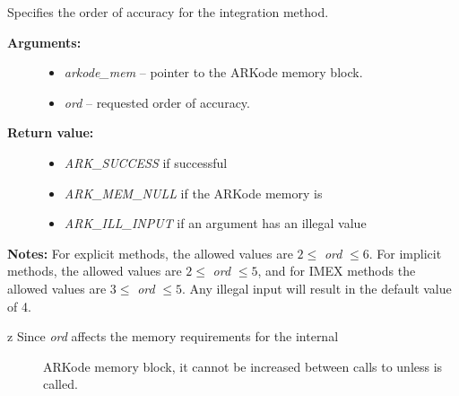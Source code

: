 \documentclass[letterpaper,10pt,english]{sphinxmanual}
\begin{document}
\begin{fulllineitems}
\label{c_interface/User_callable:c.ARKodeSetOrder}
Specifies the order of accuracy for the integration method.
\begin{description}
\item[{\textbf{Arguments:}}] \leavevmode\begin{itemize}
\item {} 
\emph{arkode\_mem} -- pointer to the ARKode memory block.

\item {} 
\emph{ord} -- requested order of accuracy.

\end{itemize}

\item[{\textbf{Return value:}}] \leavevmode\begin{itemize}
\item {} 
\emph{ARK\_SUCCESS} if successful

\item {} 
\emph{ARK\_MEM\_NULL} if the ARKode memory is 

\item {} 
\emph{ARK\_ILL\_INPUT} if an argument has an illegal value

\end{itemize}

\end{description}

\textbf{Notes:} For explicit methods, the allowed values are \(2 \le\)
\emph{ord} \(\le 6\).  For implicit methods, the allowed values are
\(2\le\) \emph{ord} \(\le 5\), and for IMEX methods the allowed
values are \(3 \le\) \emph{ord} \(\le 5\).  Any illegal input
will result in the default value of 4.

\end{fulllineitems}

\begin{description}
\item[{z   Since \emph{ord} affects the memory requirements for the internal}] \leavevmode
ARKode memory block, it cannot be increased between calls to
{\hyperref[c_interface/User_callable:c.ARKode]{\emph{}}} unless {\hyperref[c_interface/User_callable:c.ARKodeReInit]{\emph{}}} is called.

\end{description}
\end{document}
